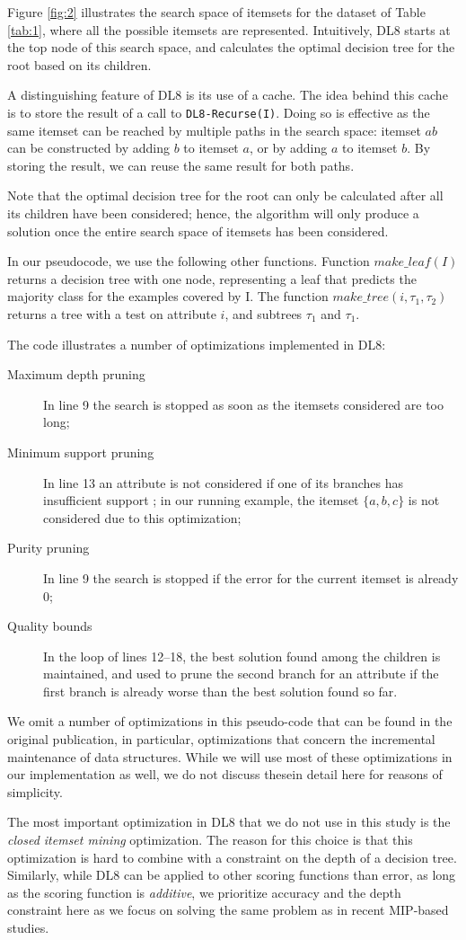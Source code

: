 Figure \ref{fig:2} illustrates the search space of itemsets for the dataset of Table \ref{tab:1}, where all the possible itemsets are represented. Intuitively, DL8 starts at the top node of this search space, and calculates the optimal decision tree for the root based on its children.

A distinguishing feature of DL8 is its use of a cache. The idea behind this cache is to store the result of a call to \verb|DL8-Recurse(I)|. Doing so is effective as the same itemset can be reached by multiple paths in the search space: itemset $ab$ can be constructed by adding $b$ to itemset $a$, or by adding $a$ to itemset $b$. By storing the result, we can reuse the same result for both paths.

Note that the optimal decision tree for the root can only be calculated after all its children have been considered; hence, the algorithm will only produce a solution once the entire search space of itemsets has been considered.

In our pseudocode, we use the following other functions. Function $make\_leaf(I)$ returns a decision tree with one node, representing a leaf that predicts the majority class for the examples covered by I. The function $make\_tree(i, \tau_1, \tau_2)$ returns a tree with a test on attribute $i$, and subtrees $\tau_1$ and $\tau_1$.

The code illustrates a number of optimizations implemented in DL8:
\begin{description}
	\item[Maximum depth pruning] In line 9 the search is stopped as soon as the itemsets considered are too long;
	\item[Minimum support pruning] In line 13 an attribute is not considered if one of its branches has insufficient support ; in our running example, the itemset $\{a, b, c\}$ is not considered due to this optimization;
	\item[Purity pruning] In line 9 the search is stopped if the error for the current itemset is already 0;
	\item[Quality bounds] In the loop of lines 12–18, the best solution found among the children is maintained, and used to prune the second branch for an attribute if the first branch is already worse than the best solution found so far.
\end{description}

We omit a number of optimizations in this pseudo-code that can be found in the original publication, in particular, optimizations that concern the incremental maintenance of data structures. While we will use most of these optimizations in our implementation as well, we do not discuss thesein detail here for reasons of simplicity.

The most important optimization in DL8 that we do not use in this study is the \emph{closed itemset mining} optimization. The reason for this choice is that this optimization is hard to combine with a constraint on the depth of a decision tree. Similarly, while DL8 can be applied to other scoring functions than error, as long as the scoring function is \emph{additive}, we prioritize accuracy and the depth constraint here as we focus on solving the same problem as in recent MIP-based studies.
